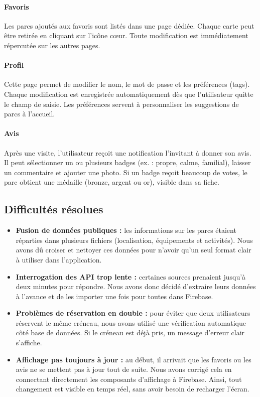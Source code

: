 \documentclass[12pt,a4paper]{article}
\begin{document}
\paragraph{Favoris \\}
Les parcs ajoutés aux favoris sont listés dans une page dédiée. Chaque carte peut être retirée en cliquant sur l'icône cœur. Toute modification est immédiatement répercutée sur les autres pages.

\paragraph{Profil \\}
Cette page permet de modifier le nom, le mot de passe et les préférences (tags). Chaque modification est enregistrée automatiquement dès que l'utilisateur quitte le champ de saisie. Les préférences servent à personnaliser les suggestions de parcs à l'accueil.

\paragraph{Avis \\}
Après une visite, l'utilisateur reçoit une notification l'invitant à donner son avis. Il peut sélectionner un ou plusieurs badges (ex. : propre, calme, familial), laisser un commentaire et ajouter une photo.  
Si un badge reçoit beaucoup de votes, le parc obtient une médaille (bronze, argent ou or), visible dans sa fiche.

\subsection{Difficultés résolues}

\begin{itemize}
  \item \textbf{Fusion de données publiques :} les informations sur les parcs étaient réparties dans plusieurs fichiers (localisation, équipements et activités). Nous avons dû croiser et nettoyer ces données pour n'avoir qu'un seul format clair à utiliser dans l'application.
  
  \item \textbf{Interrogation des API trop lente :} certaines sources prenaient jusqu'à deux minutes pour répondre. Nous avons donc décidé d'extraire leurs données à l'avance et de les importer une fois pour toutes dans Firebase.

  \item \textbf{Problèmes de réservation en double :} pour éviter que deux utilisateurs réservent le même créneau, nous avons utilisé une vérification automatique côté base de données. Si le créneau est déjà pris, un message d'erreur clair s'affiche.

  \item \textbf{Affichage pas toujours à jour :} au début, il arrivait que les favoris ou les avis ne se mettent pas à jour tout de suite. Nous avons corrigé cela en connectant directement les composants d'affichage à Firebase. Ainsi, tout changement est visible en temps réel, sans avoir besoin de recharger l'écran.
\end{itemize}
\end{document}
